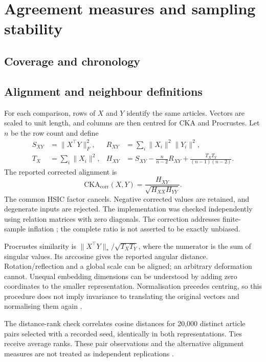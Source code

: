 \documentclass[12pt]{article}
\begin{document}
\section{Agreement measures and sampling stability}
\subsection{Coverage and chronology}

\subsection{Alignment and neighbour definitions}
For each comparison, rows of $X$ and $Y$ identify the same articles. Vectors are scaled to unit length, and columns are then centred for CKA and Procrustes. Let $n$ be the row count and define
\begin{align*}
S_{XY}&=\lVert X^\top Y\rVert_F^2, &
R_{XY}&=\sum_i\lVert X_i\rVert^2\lVert Y_i\rVert^2,\\
T_X&=\sum_i\lVert X_i\rVert^2, &
H_{XY}&=S_{XY}-\frac{n}{n-2}R_{XY}
+\frac{T_XT_Y}{(n-1)(n-2)}.
\end{align*}
The reported corrected alignment is
\[
\mathrm{CKA}_{\mathrm{corr}}(X,Y)=\frac{H_{XY}}{\sqrt{H_{XX}H_{YY}}}.
\]
The common HSIC factor cancels. Negative corrected values are retained, and degenerate inputs are rejected. The implementation was checked independently using relation matrices with zero diagonals. The correction addresses finite-sample inflation \citep{pmlr-v97-kornblith19a,refa961d84a4e}; the complete ratio is not asserted to be exactly unbiased.

Procrustes similarity is $\lVert X^\top Y\rVert_*/\sqrt{T_XT_Y}$, where the numerator is the sum of singular values. Its arccosine gives the reported angular distance. Rotation/reflection and a global scale can be aligned; an arbitrary deformation cannot. Unequal embedding dimensions can be understood by adding zero coordinates to the smaller representation. Normalisation precedes centring, so this procedure does not imply invariance to translating the original vectors and normalising them again \citep{NEURIPS2021_252a3dba}.

The distance-rank check correlates cosine distances for 20,000 distinct article pairs selected with a recorded seed, identically in both representations. Ties receive average ranks. These pair observations and the alternative alignment measures are not treated as independent replications \citep{pmlr-v285-williams24a}.
\end{document}
